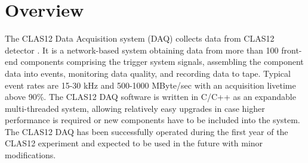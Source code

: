 \section{Overview}

The CLAS12 Data Acquisition system (DAQ) collects data from CLAS12 detector \cite{overview-ref}. It is a network-based system obtaining data from more than 100 front-end components comprising the trigger system signals, assembling the component data into events, monitoring data quality, and recording data to tape. Typical event rates are 15-30 kHz and 500-1000 MByte/sec with an acquisition livetime above 90\%. The CLAS12 DAQ software is written in C/C++ as an expandable multi-threaded system, allowing relatively easy upgrades in case higher performance is required or new components have to be included into the system. The CLAS12 DAQ has been successfully operated during the first year of the CLAS12 experiment and expected to be used in the future with minor modifications.



